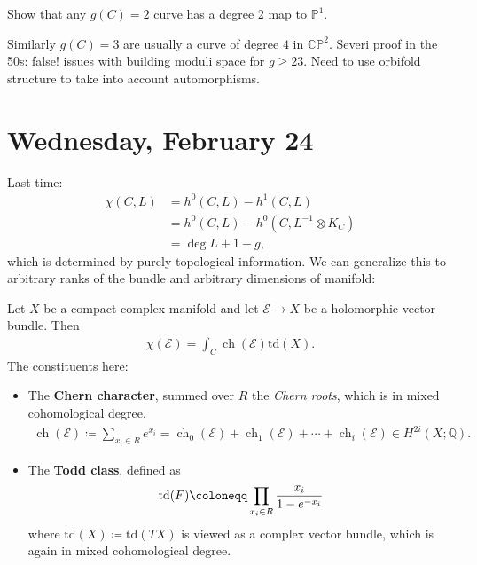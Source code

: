 \begin{exercise}[?]

Show that any \(g(C) = 2\) curve has a degree 2 map to
\({\mathbb{P}}^1\).

\end{exercise}

\begin{remark}

Similarly \(g(C) = 3\) are usually a curve of degree \(4\) in
\({\mathbb{CP}}^2\). Severi proof in the 50s: false! issues with
building moduli space for \(g\geq 23\). Need to use orbifold structure
to take into account automorphisms.

\end{remark}

\hypertarget{wednesday-february-24}{%
\section{Wednesday, February 24}\label{wednesday-february-24}}

Last time:
\begin{align*}
\chi(C, L) 
&= h^0(C, L) - h^1(C, L) \\
&= h^0(C, L) - h^0(C, L ^{-1} \otimes K_C) \\
&= \deg L + 1 -g
,\end{align*}
which is determined by purely topological information. We can generalize
this to arbitrary ranks of the bundle and arbitrary dimensions of
manifold:

\begin{theorem}

Let \(X\) be a compact complex manifold and let \(\mathcal{E} \to X\) be
a holomorphic vector bundle. Then
\begin{align*}
\chi( \mathcal{E} ) = \int_C \operatorname{ch}( \mathcal{E} ) \mathrm{td}(X)
.\end{align*}
The constituents here:

\begin{itemize}
\item
  The \textbf{Chern character}, summed over \(R\) the \emph{Chern
  roots}, which is in mixed cohomological degree.
  \begin{align*}
  \operatorname{ch}( \mathcal{E} ) \coloneqq\sum_{x_i \in R} e^{x_i} = \operatorname{ch}_0( \mathcal{E} ) + \operatorname{ch}_1( \mathcal{E} ) + \cdots + \operatorname{ch}_i( \mathcal{E} ) \in H^{2i}(X; {\mathbb{Q}})
  .\end{align*}
\item
  The \textbf{Todd class}, defined as
  \begin{align*}
  \mathrm{td}( F) \coloneqq\prod_{x_i \in R} {x_i \over 1 - e^{-x_i} }
  \end{align*}
  where \(\mathrm{td}(X) \coloneqq\mathrm{td}(TX)\) is viewed as a
  complex vector bundle, which is again in mixed cohomological degree.
\end{itemize}

\end{theorem}

